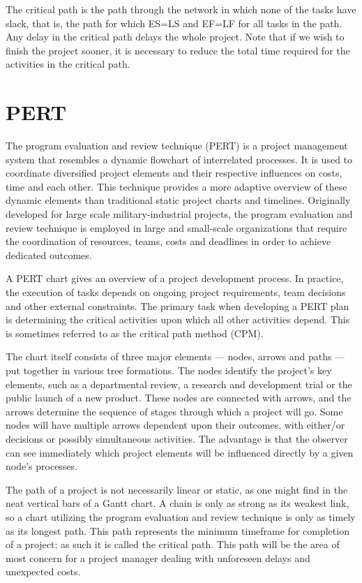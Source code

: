 The critical path is the path through the network in which none of the tasks have slack, that is, the path for which ES=LS and EF=LF for all tasks in the path. Any delay in the critical path delays the whole project. Note that if we wish to finish the project sooner, it is necessary to reduce the total time required for the activities in the critical path.

\section{PERT}

The program evaluation and review technique (PERT) is a project management system that resembles a dynamic flowchart of interrelated processes. It is used to coordinate diversified project elements and their respective influences on costs, time and each other. This technique provides a more adaptive overview of these dynamic elements than traditional static project charts and timelines. Originally developed for large scale military-industrial projects, the program evaluation and review technique is employed in large and small-scale organizations that require the coordination of resources, teams, costs and deadlines in order to achieve dedicated outcomes.

A PERT chart gives an overview of a project development process. In practice, the execution of tasks depends on ongoing project requirements, team decisions and other external constraints. The primary task when developing a PERT plan is determining the critical activities upon which all other activities depend. This is sometimes referred to as the critical path method (CPM).

The chart itself consists of three major elements — nodes, arrows and paths — put together in various tree formations. The nodes identify the project's key elements, such as a departmental review, a research and development trial or the public launch of a new product. These nodes are connected with arrows, and the arrows determine the sequence of stages through which a project will go. Some nodes will have multiple arrows dependent upon their outcomes, with either/or decisions or possibly simultaneous activities. The advantage is that the observer can see immediately which project elements will be influenced directly by a given node's processes.

The path of a project is not necessarily linear or static, as one might find in the neat vertical bars of a Gantt chart. A chain is only as strong as its weakest link, so a chart utilizing the program evaluation and review technique is only as timely as its longest path. This path represents the minimum timeframe for completion of a project; as such it is called the critical path. This path will be the area of most concern for a project manager dealing with unforeseen delays and unexpected costs.


